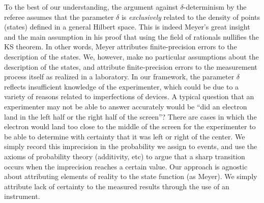 \documentclass[english,reprint, aps, prl,superscriptaddress, showpacs,
showkeys, longbibliography, amsmath, amssymb, floatfix]{revtex4-1}
\theoremstyle{plain}
\theoremstyle{definition}
\begin{document}
To the best of our understanding, the argument against $\delta$-determinism
by the referee assumes that the parameter $\delta$ is \emph{exclusively}
related to the density of points (states) defined in a general Hilbert
space. This is indeed Meyer's great insight and the main assumption
in his proof that using the field of rationals nullifies the KS theorem.
In other words, Meyer attributes finite-precision errors to the description
of the states. We, however, make no particular assumptions about the
description of the states, and attribute finite-precision errors to
the measurement process itself as realized in a laboratory. In our
framework, the parameter $\delta$ reflects insufficient knowledge
of the experimenter, which could be due to a variety of reasons related
to imperfections of devices. A typical question that an experimenter
may not be able to answer accurately would be ``did an electron land
in the left half or the right half of the screen''? There are cases
in which the electron would land too close to the middle of the screen
for the experimenter to be able to determine with certainty that it
was left or right of the center. We simply record this imprecision
in the probability we assign to events, and use the axioms of probability
theory (additivity, etc) to argue that a sharp transition occurs when
the imprecision reaches a certain value. Our
approach is agnostic about attributing elements of reality to the
state function (as Meyer). We simply attribute lack of certainty to
the measured results through the use of an instrument. 
\end{document}
